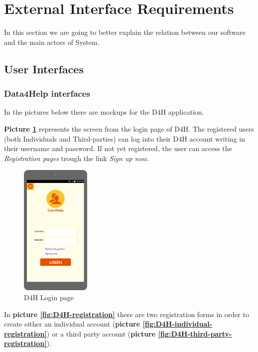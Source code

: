 \section{External Interface Requirements}

In this section we are going to better explain the relation between our software and the main actors of System.

\subsection{User Interfaces}

\subsubsection{Data4Help interfaces}
In the pictures below there are mockups for the D4H application.

\textbf{Picture \ref{fig:D4H-login-page}} represents the screen from the login page of D4H.  The registered users (both Individuals and Third-parties) can log into their D4H account writing in their username and password. If not yet registered, the user can access the \emph{Registration pages} trough the link \emph{Sign up now}.

\begin{figure}[H]
  \centering
  
  \includegraphics[width=0.30\textwidth]{pictures/mockup/D4H-login.png}
  \caption{D4H Login page}
  \label{fig:D4H-login-page}
\end{figure}


In \textbf{picture \ref{fig:D4H-registration}} there are two registration forms in order to create either an individual account (\textbf{picture \ref{fig:D4H-individual-registration}}) or a third party account (\textbf{picture \ref{fig:D4H-third-party-registration}}).



